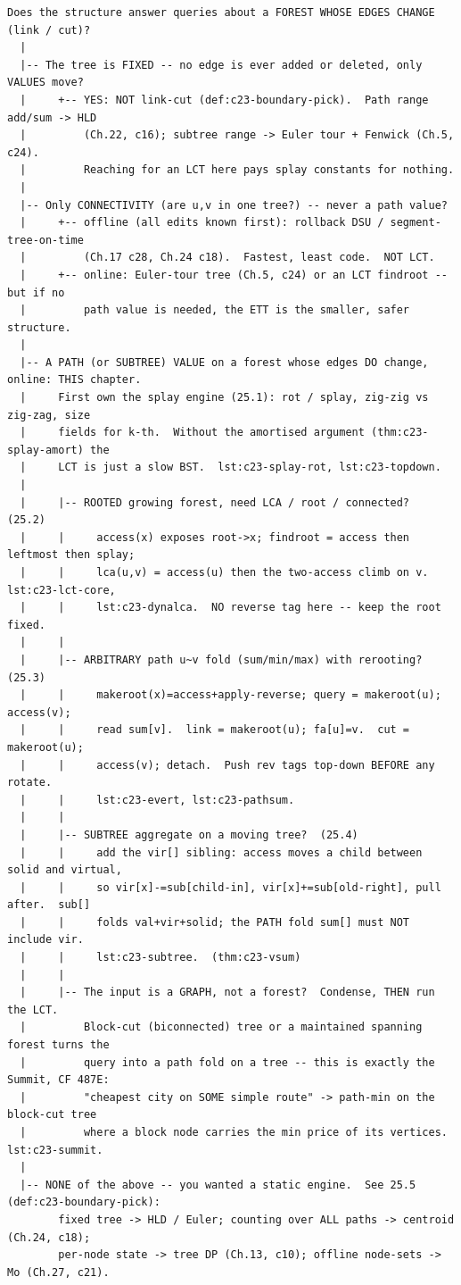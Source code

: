 \begin{lstlisting}[language={}, basicstyle=\ttfamily\small, numbers=none, frame=single]
  Does the structure answer queries about a FOREST WHOSE EDGES CHANGE (link / cut)?
  |
  |-- The tree is FIXED -- no edge is ever added or deleted, only VALUES move?
  |     +-- YES: NOT link-cut (def:c23-boundary-pick).  Path range add/sum -> HLD
  |         (Ch.22, c16); subtree range -> Euler tour + Fenwick (Ch.5, c24).
  |         Reaching for an LCT here pays splay constants for nothing.
  |
  |-- Only CONNECTIVITY (are u,v in one tree?) -- never a path value?
  |     +-- offline (all edits known first): rollback DSU / segment-tree-on-time
  |         (Ch.17 c28, Ch.24 c18).  Fastest, least code.  NOT LCT.
  |     +-- online: Euler-tour tree (Ch.5, c24) or an LCT findroot -- but if no
  |         path value is needed, the ETT is the smaller, safer structure.
  |
  |-- A PATH (or SUBTREE) VALUE on a forest whose edges DO change, online: THIS chapter.
  |     First own the splay engine (25.1): rot / splay, zig-zig vs zig-zag, size
  |     fields for k-th.  Without the amortised argument (thm:c23-splay-amort) the
  |     LCT is just a slow BST.  lst:c23-splay-rot, lst:c23-topdown.
  |
  |     |-- ROOTED growing forest, need LCA / root / connected?  (25.2)
  |     |     access(x) exposes root->x; findroot = access then leftmost then splay;
  |     |     lca(u,v) = access(u) then the two-access climb on v.  lst:c23-lct-core,
  |     |     lst:c23-dynalca.  NO reverse tag here -- keep the root fixed.
  |     |
  |     |-- ARBITRARY path u~v fold (sum/min/max) with rerooting?  (25.3)
  |     |     makeroot(x)=access+apply-reverse; query = makeroot(u); access(v);
  |     |     read sum[v].  link = makeroot(u); fa[u]=v.  cut = makeroot(u);
  |     |     access(v); detach.  Push rev tags top-down BEFORE any rotate.
  |     |     lst:c23-evert, lst:c23-pathsum.
  |     |
  |     |-- SUBTREE aggregate on a moving tree?  (25.4)
  |     |     add the vir[] sibling: access moves a child between solid and virtual,
  |     |     so vir[x]-=sub[child-in], vir[x]+=sub[old-right], pull after.  sub[]
  |     |     folds val+vir+solid; the PATH fold sum[] must NOT include vir.
  |     |     lst:c23-subtree.  (thm:c23-vsum)
  |     |
  |     |-- The input is a GRAPH, not a forest?  Condense, THEN run the LCT.
  |         Block-cut (biconnected) tree or a maintained spanning forest turns the
  |         query into a path fold on a tree -- this is exactly the Summit, CF 487E:
  |         "cheapest city on SOME simple route" -> path-min on the block-cut tree
  |         where a block node carries the min price of its vertices.  lst:c23-summit.
  |
  |-- NONE of the above -- you wanted a static engine.  See 25.5 (def:c23-boundary-pick):
        fixed tree -> HLD / Euler; counting over ALL paths -> centroid (Ch.24, c18);
        per-node state -> tree DP (Ch.13, c10); offline node-sets -> Mo (Ch.27, c21).
\end{lstlisting}

